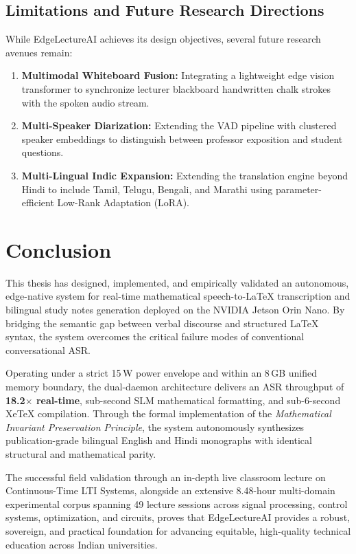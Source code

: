 \documentclass[11pt,a4paper,oneside]{report}
\begin{document}
\section{Limitations and Future Research Directions}
While EdgeLectureAI achieves its design objectives, several future research avenues remain:
\begin{enumerate}[noitemsep]
    \item \textbf{Multimodal Whiteboard Fusion:} Integrating a lightweight edge vision transformer to synchronize lecturer blackboard handwritten chalk strokes with the spoken audio stream.
    \item \textbf{Multi-Speaker Diarization:} Extending the VAD pipeline with clustered speaker embeddings to distinguish between professor exposition and student questions.
    \item \textbf{Multi-Lingual Indic Expansion:} Extending the translation engine beyond Hindi to include Tamil, Telugu, Bengali, and Marathi using parameter-efficient Low-Rank Adaptation (LoRA).
\end{enumerate}

\chapter{Conclusion}
\label{chap:conclusion}

This thesis has designed, implemented, and empirically validated an autonomous, edge-native system for real-time mathematical speech-to-LaTeX transcription and bilingual study notes generation deployed on the NVIDIA Jetson Orin Nano. By bridging the semantic gap between verbal discourse and structured LaTeX syntax, the system overcomes the critical failure modes of conventional conversational ASR.

Operating under a strict 15\,W power envelope and within an 8\,GB unified memory boundary, the dual-daemon architecture delivers an ASR throughput of \textbf{18.2$\times$ real-time}, sub-second SLM mathematical formatting, and sub-6-second XeTeX compilation. Through the formal implementation of the \textit{Mathematical Invariant Preservation Principle}, the system autonomously synthesizes publication-grade bilingual English and Hindi monographs with identical structural and mathematical parity. 

The successful field validation through an in-depth live classroom lecture on Continuous-Time LTI Systems, alongside an extensive 8.48-hour multi-domain experimental corpus spanning 49 lecture sessions across signal processing, control systems, optimization, and circuits, proves that EdgeLectureAI provides a robust, sovereign, and practical foundation for advancing equitable, high-quality technical education across Indian universities.
\end{document}
